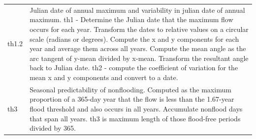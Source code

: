 \documentclass[a4paper,11pt]{article}\usepackage[]{graphicx}\usepackage[]{color}
\begin{document}
\begin{table}[ht]
\begin{threeparttable}[b]
\begin{tabularx}{\textwidth}{|l|X|}
  th1.2 & Julian date of annual maximum and variability in julian date of annual maximum. th1 - Determine the Julian date that the maximum flow occurs for each year. Transform the dates to relative values on a circular scale (radians or degrees). Compute the x and y components for each year and average them across all years. Compute the mean angle as the arc tangent of y-mean divided by x-mean. Transform the resultant angle back to Julian date. th2 - compute the coefficient of variation for the mean x and y components and convert to a date. \\
  th3 & Seasonal predictability of nonflooding. Computed as the maximum proportion of a 365-day year that the flow is less than the 1.67-year flood threshold and also occurs in all years. Accumulate nonflood days that span all years. th3 is maximum length of those flood-free periods divided by 365. \\
   \hline
\end{tabularx}
\end{threeparttable}
\end{table}
\end{document}
